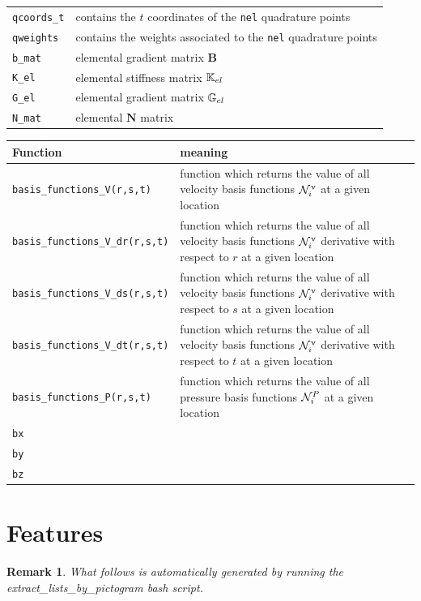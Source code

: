 \documentclass[a4paper,11pt]{report}
\newtheorem*{remark}{Remark}
\begin{document}
\begin{tabular}{p{3.5cm}p{12.5cm}}
{\tt qcoords\_t} & contains the $t$ coordinates of the {\tt nel} quadrature points \\
{\tt qweights} & contains the weights associated to the {\tt nel} quadrature points \\
{\tt b\_mat} & elemental gradient matrix ${\bm B}$ \\
{\tt K\_el}  & elemental stiffness matrix ${\mathbb{K}}_{el}$ \\
{\tt G\_el}  & elemental gradient matrix ${\mathbb{G}}_{el}$ \\
{\tt N\_mat}  & elemental ${\bm N}$ matrix \\
\hline
\end{tabular}

\vspace{.5cm}

\begin{tabular}{p{2cm}p{14cm}}
\hline
Function & meaning \\
\hline
{\tt basis\_functions\_V(r,s,t)}    & 
function which returns the value of all velocity basis functions ${\cal N}_i^\upnu$ at a given location\\
{\tt basis\_functions\_V\_dr(r,s,t)} & 
function which returns the value of all velocity basis functions ${\cal N}_i^\upnu$ derivative with respect to $r$ at a given location\\
{\tt basis\_functions\_V\_ds(r,s,t)} &
function which returns the value of all velocity basis functions ${\cal N}_i^\upnu$ derivative with respect to $s$ at a given location\\
{\tt basis\_functions\_V\_dt(r,s,t)} &
function which returns the value of all velocity basis functions ${\cal N}_i^\upnu$ derivative with respect to $t$ at a given location\\
{\tt basis\_functions\_P(r,s,t)}    & 
function which returns the value of all pressure basis functions ${\cal N}_i^P$ at a given location\\
{\tt bx} & \\
{\tt by} & \\
{\tt bz} & \\
\hline
\end{tabular}

\newpage
\section{Features}

\begin{remark}
What follows is automatically generated by running the extract\_lists\_by\_pictogram bash script.
\end{remark}
\end{document}

